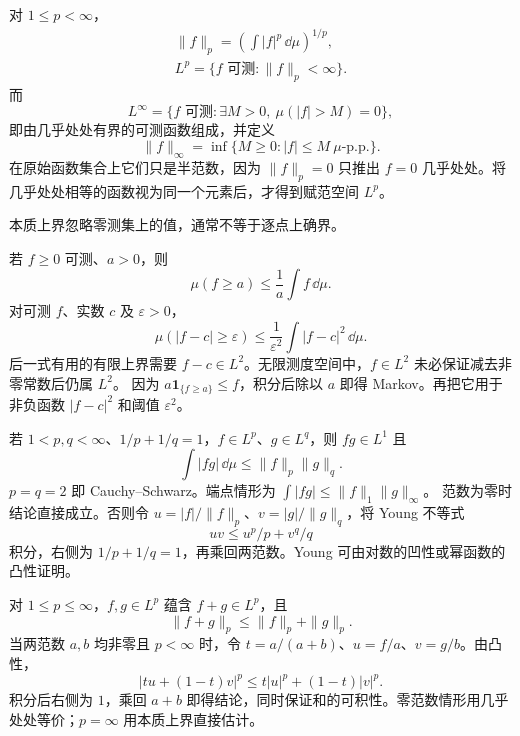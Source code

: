 对 $1\le p<\infty$，
\[
\begin{gathered}
\|f\|_p=\left(\int|f|^p\,\dd\mu\right)^{1/p},\\
L^p=\{f\text{ 可测}:\|f\|_p<\infty\}.
\end{gathered}
\]
而
\[
L^\infty=\{f\text{ 可测}:\exists M>0,\ \mu(|f|>M)=0\},
\]
即由几乎处处有界的可测函数组成，并定义
\[
\|f\|_\infty
=\inf\{M\ge0:|f|\le M\ \mu\text{-p.p.}\}.
\]
在原始函数集合上它们只是半范数，因为 $\|f\|_p=0$ 只推出 $f=0$ 几乎处处。将几乎处处相等的函数视为同一个元素后，才得到赋范空间 $L^p$。

本质上界忽略零测集上的值，通常不等于逐点上确界。

若 $f\ge0$ 可测、$a>0$，则
\[
\mu(f\ge a)\le\frac1a\int f\,\dd\mu.
\]
对可测 $f$、实数 $c$ 及 $\varepsilon>0$，
\[
\mu(|f-c|\ge\varepsilon)
\le\frac1{\varepsilon^2}\int|f-c|^2\,\dd\mu.
\]
后一式有用的有限上界需要 $f-c\in L^2$。无限测度空间中，$f\in L^2$ 未必保证减去非零常数后仍属 $L^2$。
因为 $a\mathbf1_{\{f\ge a\}}\le f$，积分后除以 $a$ 即得 Markov。再把它用于非负函数 $|f-c|^2$ 和阈值 $\varepsilon^2$。

若 $1<p,q<\infty$、$1/p+1/q=1$，$f\in L^p$、$g\in L^q$，则 $fg\in L^1$ 且
\[
\int|fg|\,\dd\mu\le\|f\|_p\|g\|_q.
\]
$p=q=2$ 即 Cauchy–Schwarz。端点情形为 $\int|fg|\le\|f\|_1\|g\|_\infty$。
范数为零时结论直接成立。否则令 $u=|f|/\|f\|_p$、$v=|g|/\|g\|_q$，将 Young 不等式
\[
uv\le u^p/p+v^q/q
\]
积分，右侧为 $1/p+1/q=1$，再乘回两范数。Young 可由对数的凹性或幂函数的凸性证明。

对 $1\le p\le\infty$，$f,g\in L^p$ 蕴含 $f+g\in L^p$，且
\[
\|f+g\|_p\le\|f\|_p+\|g\|_p.
\]
当两范数 $a,b$ 均非零且 $p<\infty$ 时，令 $t=a/(a+b)$、$u=f/a$、$v=g/b$。由凸性，
\[
|tu+(1-t)v|^p\le t|u|^p+(1-t)|v|^p.
\]
积分后右侧为 $1$，乘回 $a+b$ 即得结论，同时保证和的可积性。零范数情形用几乎处处等价；$p=\infty$ 用本质上界直接估计。

